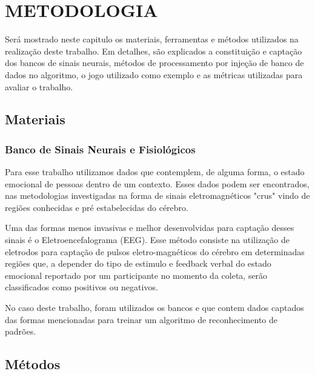 \chapter{METODOLOGIA}
\label{metodologia}

Será mostrado neste capitulo os materiais, ferramentas e métodos utilizados na realização deste trabalho. Em detalhes, são explicados a constituição e captação dos bancos de sinais neurais, métodos de processamento por injeção de banco de dados no algoritmo, o jogo utilizado como exemplo e as métricas utilizadas para avaliar o trabalho. 

\section{Materiais}

\subsection{Banco de Sinais Neurais e Fisiológicos}
Para esse trabalho utilizamos dados que contemplem, de alguma forma, o estado emocional de pessoas dentro de um contexto. Esses dados podem ser encontrados, nas metodologias investigadas na forma de sinais eletromagnéticos "crus" vindo de regiões conhecidas e pré estabelecidas do cérebro.

Uma das formas menos invasivas e melhor desenvolvidas para captação desses sinais é o Eletroencefalograma (EEG). Esse método consiste na utilização de eletrodos para captação de pulsos eletro-magnéticos do cérebro em determinadas regiões que, a depender do tipo de estimulo e feedback verbal do estado emocional reportado por um participante no momento da coleta, serão classificados como positivos ou negativos.

No caso deste trabalho, foram utilizados os bancos \cite{linkbase1} e \cite{linkbase2} que contem dados captados das formas mencionadas para treinar um algoritmo de reconhecimento de padrões. 

\section{Métodos}


